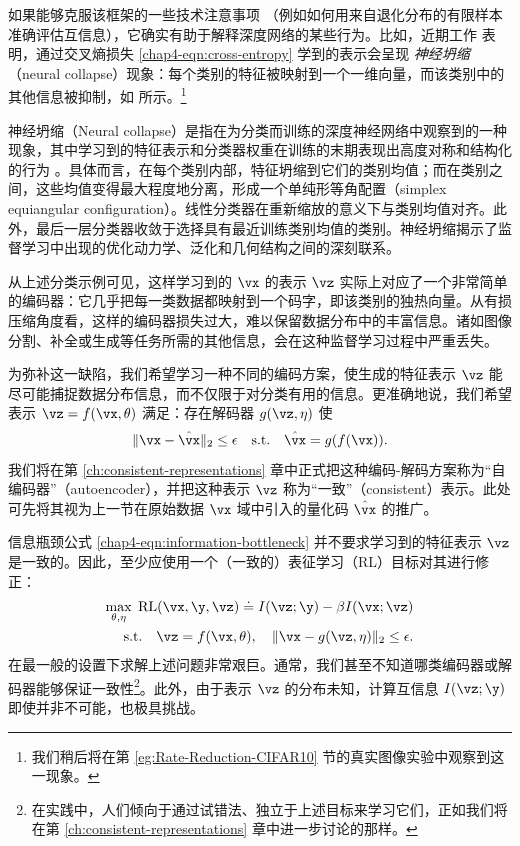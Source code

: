 \documentclass[../../book-main_zh.tex]{subfiles}
\begin{document}
如果能够克服该框架的一些技术注意事项 \cite{kolchinsky2018caveats-ICLR2018}（例如如何用来自退化分布的有限样本准确评估互信息），它确实有助于解释深度网络的某些行为。比如，近期工作 \cite{papyan2020prevalence} 表明，通过交叉熵损失 \eqref{chap4-eqn:cross-entropy} 学到的表示会呈现 \emph{神经坍缩}（neural collapse）现象：每个类别的特征被映射到一个一维向量，而该类别中的其他信息被抑制，如  所示。\footnote{我们稍后将在第 \ref{eg:Rate-Reduction-CIFAR10} 节的真实图像实验中观察到这一现象。}
\begin{remark}[神经坍缩]
    神经坍缩（Neural collapse）是指在为分类而训练的深度神经网络中观察到的一种现象，其中学习到的特征表示和分类器权重在训练的末期表现出高度对称和结构化的行为 \cite{papyan2020prevalence,zhu2021geometric,yaras2022neural}。具体而言，在每个类别内部，特征坍缩到它们的类别均值；而在类别之间，这些均值变得最大程度地分离，形成一个单纯形等角配置（simplex equiangular configuration）。线性分类器在重新缩放的意义下与类别均值对齐。此外，最后一层分类器收敛于选择具有最近训练类别均值的类别。神经坍缩揭示了监督学习中出现的优化动力学、泛化和几何结构之间的深刻联系。
    \label{remark:neural-collapse}
\end{remark}

从上述分类示例可见，这样学习到的 $\vx$ 的表示 $\vz$ 实际上对应了一个非常简单的编码器：它几乎把每一类数据都映射到一个码字，即该类别的独热向量。从有损压缩角度看，这样的编码器损失过大，难以保留数据分布中的丰富信息。诸如图像分割、补全或生成等任务所需的其他信息，会在这种监督学习过程中严重丢失。

为弥补这一缺陷，我们希望学习一种不同的编码方案，使生成的特征表示 $\vz$ 能尽可能捕捉数据分布信息，而不仅限于对分类有用的信息。更准确地说，我们希望表示 $\vz = f(\vx, \theta)$ 满足：存在解码器 $g(\vz,\eta)$ 使
\begin{equation}
    \|\vx - \hat \vx\|_2 \le \epsilon \quad \mbox{s.t.} \quad \hat{\vx}
    = g(f(\vx)).
\end{equation}
我们将在第 \ref{ch:consistent-representations} 章中正式把这种编码-解码方案称为“自编码器”（autoencoder），并把这种表示 $\vz$ 称为“一致”（consistent）表示。此处可先将其视为上一节在原始数据 $\vx$ 域中引入的量化码 $\hat \vx$ 的推广。

信息瓶颈公式 \eqref{chap4-eqn:information-bottleneck} 并不要求学习到的特征表示 $\vz$ 是一致的。因此，至少应使用一个（一致的）表征学习（RL）目标对其进行修正：
\begin{eqnarray}
    \max_{\theta,\eta}\; \mbox{RL}(\vx, \y, \vz) \doteq I(\vz; \y) - \beta
    I(\vx; \vz) \nonumber \\ \mathrm{s.t.}\quad  \vz = f(\vx,\theta),\quad
    \|\vx - g(\vz, \eta) \|_2 \le \epsilon.
    \label{chap4-eqn:representation-learning}
\end{eqnarray}
在最一般的设置下求解上述问题非常艰巨。通常，我们甚至不知道哪类编码器或解码器能够保证一致性\footnote{在实践中，人们倾向于通过试错法、独立于上述目标来学习它们，正如我们将在第 \ref{ch:consistent-representations} 章中进一步讨论的那样。}。此外，由于表示 $\vz$ 的分布未知，计算互信息 $I(\vz;\y)$ 即使并非不可能，也极具挑战。
\end{document}
